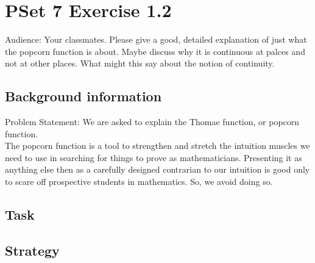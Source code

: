 \documentclass[11 pt]{article}
\begin{document}
\section{PSet 7 Exercise 1.2}
Audience: Your classmates.
Please give a good, detailed explanation of just what the popcorn function is about. Maybe discuss why it is continuous at palces and not at other places. What might this say about the notion of continuity.
\begin{multicols*}{2} 
\subsection{Background information}
Problem Statement: We are asked to explain the Thomae function, or popcorn function.\\
The popcorn function is a tool to strengthen and stretch the intuition muscles we need to use in searching for things to prove as mathematicians. Presenting it as anything else then as a carefully designed contrarian to our intuition is good only to scare off prospective students in mathematics. So, we avoid doing so.
\subsection{Task}
\subsection{Strategy}
\columnbreak

\end{multicols*}
\end{document}
